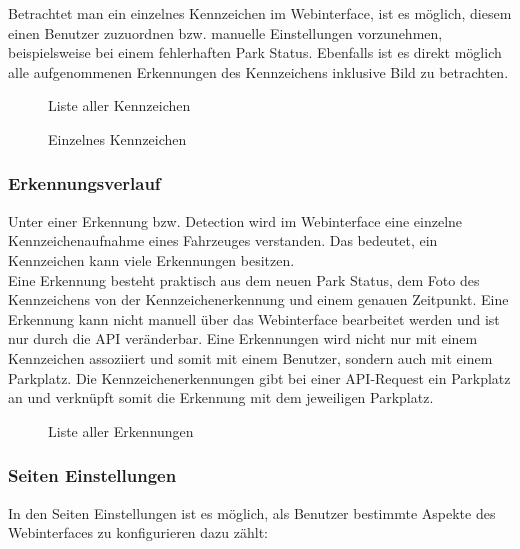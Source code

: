 Betrachtet man ein einzelnes Kennzeichen im Webinterface, ist es möglich, diesem
einen Benutzer zuzuordnen bzw. manuelle Einstellungen vorzunehmen, beispielsweise
bei einem fehlerhaften Park Status. Ebenfalls ist es direkt möglich alle
aufgenommenen Erkennungen des Kennzeichens inklusive Bild zu betrachten.

\begin{figure}[H]
  \centering
  \caption{Liste aller Kennzeichen}
\end{figure}

\begin{figure}[H]
  \centering
  \caption{Einzelnes Kennzeichen}
\end{figure}

\subsubsection{Erkennungsverlauf}
Unter einer Erkennung bzw. Detection wird im Webinterface eine einzelne
Kennzeichenaufnahme eines Fahrzeuges verstanden. Das bedeutet, ein Kennzeichen
kann viele Erkennungen besitzen.\\

Eine Erkennung besteht praktisch aus dem neuen Park Status, dem Foto des
Kennzeichens von der Kennzeichenerkennung und einem genauen Zeitpunkt. Eine
Erkennung kann nicht manuell über das Webinterface bearbeitet werden und ist nur
durch die API veränderbar. Eine Erkennungen wird nicht nur mit einem Kennzeichen
assoziiert und somit mit einem Benutzer, sondern auch mit einem Parkplatz. Die
Kennzeichenerkennungen gibt bei einer API-Request ein Parkplatz an und verknüpft
somit die Erkennung mit dem jeweiligen Parkplatz. 

\begin{figure}[H]
  \centering
  \caption{Liste aller Erkennungen}
\end{figure}

\subsubsection{Seiten Einstellungen}
In den Seiten Einstellungen ist es möglich, als Benutzer bestimmte Aspekte des
Webinterfaces zu konfigurieren dazu zählt:

